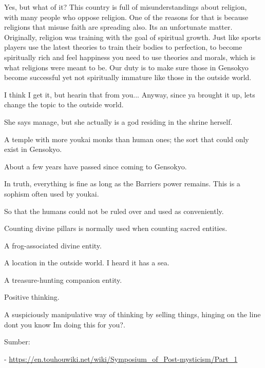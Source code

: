 \begin{tcolorbox}[breakable, colback=white, colframe=black!80,
  boxrule=0.6pt, arc=0mm, left=3mm, right=3mm, top=2mm, bottom=2mm]
\medskip
Yes, but what of it? This country is full of misunderstandings about religion, with many people who oppose religion. One of the reasons for that is because religions that misuse faith are spreading also. It\textquotesingle{}s an unfortunate matter. Originally, religion was training with the goal of spiritual growth. Just like sports players use the latest theories to train their bodies to perfection, to become spiritually rich and feel happiness you need to use theories and morals, which is what religions were meant to be. Our duty is to make sure those in Gensokyo become successful yet not spiritually immature like those in the outside world.\par
\medskip
I think I get it, but hearin\textquotesingle{} that from you... Anyway, since ya brought it up, let\textquotesingle{}s change the topic to the outside world.\par
\medskip
She says \textquotedbl{}manage\textquotedbl{}, but she actually is a god residing in the shrine herself.\par
A temple with more youkai monks than human ones; the sort that could only exist in Gensokyo.\par
About a few years have passed since coming to Gensokyo.\par
In truth, everything is fine as long as the Barrier\textquotesingle{}s power remains. This is a sophism often used by youkai.\par
So that the humans could not be ruled over and used as conveniently.\par
Counting divine pillars is normally used when counting sacred entities.\par
A frog-{}associated divine entity.\par
A location in the outside world. I heard it has a sea.\par
A treasure-{}hunting companion entity.\par
Positive thinking.\par
A suspiciously manipulative way of thinking by selling things, hinging on the line \textquotedbl{}don\textquotesingle{}t you know I\textquotesingle{}m doing this for you?\textquotedbl{}.\par
\bigskip
Sumber:\par
\hspace*{1.5em}- \url{https://en.touhouwiki.net/wiki/Symposium_of_Post-mysticism/Part_1}
\end{tcolorbox}
